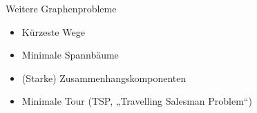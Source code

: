 \begin{frame}{Weitere Graphenprobleme}
	\begin{itemize}[<+->]
		\item Kürzeste Wege
		\item Minimale Spannbäume
		\item (Starke) Zusammenhangskomponenten
		\item Minimale Tour (TSP, „Travelling Salesman Problem“)
	\end{itemize}
	

\end{frame}

